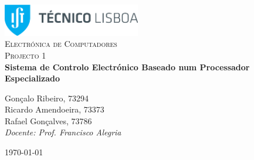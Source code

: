 \begin{titlepage}

\begin{center}

\includegraphics[width=6cm]{./title}\\[3cm]

\textsc{\LARGE Electrónica de Computadores}\\[1.5cm]

\textsc{\Large Projecto 1}\\[1.5cm]


{ \huge \bfseries Sistema de Controlo Electrónico Baseado num Processador Especializado \\[2.5cm] }


\noindent
\begin{center} \large
Gonçalo Ribeiro, 73294\\[5mm]

Ricardo Amendoeira, 73373\\[5mm]

Rafael Gonçalves, 73786\\[2.5cm]

\textit{Docente: Prof. Francisco Alegria}

\end{center}

\vfill

{\large \today}

\end{center}

\end{titlepage}